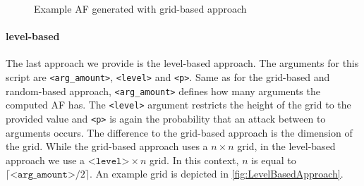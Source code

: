 \begin{figure}[h]
\begin{minipage}{.3\textwidth}
    \label{af:ImplementationGridBasedExampleAFsc}
\end{minipage}
\caption{Example AF generated with grid-based approach}
\label{fig:ImplementationGridBasedExampleAFs}
\end{figure}
\vspace{0.3cm}



\paragraph{level-based} The last approach we provide is the level-based approach. The arguments for this script are \texttt{<arg\_amount>}, \texttt{<level>} and \texttt{<p>}. Same as for the grid-based and random-based approach, \texttt{<arg\_amount>} defines how many arguments the computed AF has. The \texttt{<level>} argument restricts the height of the grid to the provided value and \texttt{<p>} is again the probability that an attack between to arguments occurs. The difference to the grid-based approach is the dimension of the grid. While the grid-based approach uses a $n \times n$ grid, in the level-based approach we use a $\texttt{<level>} \times n$ grid. In this context, $n$ is equal to $\lceil \texttt{<arg\_amount>}/2 \rceil$. An example grid is depicted in \cref{fig:LevelBasedApproach}.


